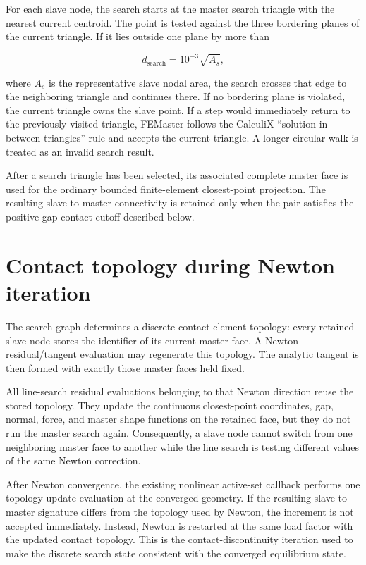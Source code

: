 For each slave node, the search starts at the master search triangle with the nearest current centroid. The point is tested against the three bordering planes of the current triangle. If it lies outside one plane by more than

\[
    d_\mathrm{search} = 10^{-3}\sqrt{A_s},
\]

where \(A_s\) is the representative slave nodal area, the search crosses that edge to the neighboring triangle and continues there. If no bordering plane is violated, the current triangle owns the slave point. If a step would immediately return to the previously visited triangle, FEMaster follows the CalculiX ``solution in between triangles'' rule and accepts the current triangle. A longer circular walk is treated as an invalid search result.

After a search triangle has been selected, its associated complete master face is used for the ordinary bounded finite-element closest-point projection. The resulting slave-to-master connectivity is retained only when the pair satisfies the positive-gap contact cutoff described below.

\section{Contact topology during Newton iteration}

The search graph determines a discrete contact-element topology: every retained slave node stores the identifier of its current master face. A Newton residual/tangent evaluation may regenerate this topology. The analytic tangent is then formed with exactly those master faces held fixed.

All line-search residual evaluations belonging to that Newton direction reuse the stored topology. They update the continuous closest-point coordinates, gap, normal, force, and master shape functions on the retained face, but they do not run the master search again. Consequently, a slave node cannot switch from one neighboring master face to another while the line search is testing different values of the same Newton correction.

After Newton convergence, the existing nonlinear active-set callback performs one topology-update evaluation at the converged geometry. If the resulting slave-to-master signature differs from the topology used by Newton, the increment is not accepted immediately. Instead, Newton is restarted at the same load factor with the updated contact topology. This is the contact-discontinuity iteration used to make the discrete search state consistent with the converged equilibrium state.

